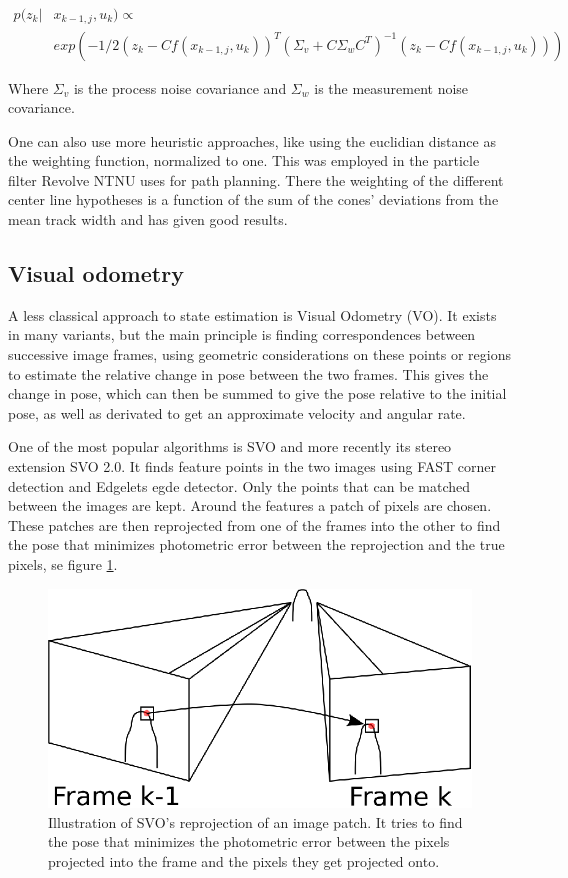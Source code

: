 \begin{align}
    p(z_k| & x_{k-1, j}, u_k) \propto \\
    & exp(-1/2(z_k - Cf(x_{k-1, j}, u_k))^T
    (\Sigma_v + C\Sigma_wC^T)^{-1}(z_k - Cf(x_{k-1, j}, u_k))) \nonumber
\end{align}

Where $\Sigma_v$ is the process noise covariance and $\Sigma_w$ is the measurement noise covariance.  

One can also use more heuristic approaches, like using the euclidian distance as the weighting function, normalized to one. This was employed in the particle filter Revolve NTNU uses for path planning. There the weighting of the different center line hypotheses is a function of the sum of the cones' deviations from the mean track width and has given good results.

\subsection{Visual odometry}

A less classical approach to state estimation is Visual Odometry (VO). It exists in many variants, but the main principle is finding correspondences between successive image frames, using geometric considerations on these points or regions to estimate the relative change in pose between the two frames. This gives the change in pose, which can then be summed to give the pose relative to the initial pose, as well as derivated to get an approximate velocity and angular rate.

One of the most popular algorithms is SVO\cite{SVO} and more recently its stereo extension SVO 2.0\cite{SVO2}. It finds feature points in the two images using FAST corner detection\cite{FAST} and Edgelets egde detector\cite{Edgelet}. Only the points that can be matched between the images are kept. Around the features a patch of pixels are chosen. These patches are then reprojected from one of the frames into the other to find the pose that minimizes photometric error between the reprojection and the true pixels, se figure \ref{Fig:SVO}. 

\begin{figure}
    \centering
    \includegraphics[width=0.8\linewidth]{0_Images/3_Background/SVO.eps}
    \caption[Illustration of SVO's reprojection of an image patch.]
    {Illustration of SVO's reprojection of an image patch. It tries to find the pose that minimizes the photometric error between the pixels projected into the frame and the pixels they get projected onto.}
    \label{Fig:SVO}
\end{figure}

